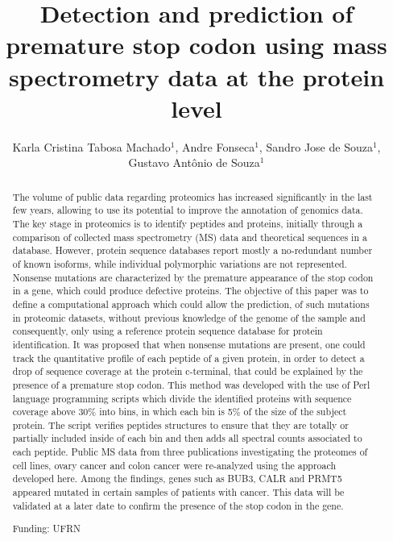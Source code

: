\documentclass[twoside]{article}
\title{\vspace{-15mm}\fontsize{24pt}{10pt}\selectfont\textbf{Detection and prediction of premature stop codon using mass spectrometry data at the protein level}} %
\author{Karla Cristina Tabosa Machado$^1$, Andre Fonseca$^1$, Sandro Jose de Souza$^1$, Gustavo Ant\^onio de Souza$^1$}
\affil{1 UFRN\\ }
\date{}
\begin{document}
\maketitle %

\thispagestyle{fancy} %


\begin{abstract}
The volume of public data regarding proteomics has increased significantly in the last few years, allowing to use its potential to improve the annotation of genomics data. The key stage in proteomics is to identify peptides and proteins, initially through a  comparison of collected mass spectrometry (MS) data and theoretical sequences in a database. However, protein sequence databases report mostly a no-redundant number of known isoforms, while individual polymorphic variations are not represented. Nonsense mutations are characterized by the premature appearance of the stop codon in a gene, which could produce defective proteins. The objective of this paper was to define a computational approach which could allow the prediction, of such mutations in proteomic datasets, without previous knowledge of the genome of the sample and consequently, only using a reference protein sequence database for protein identification. It was proposed that when nonsense mutations are present, one could track the quantitative profile of each peptide of a given protein,  in order to detect a drop of sequence coverage at the protein c-terminal, that could be explained by the presence of a premature stop codon. This method was developed with the use of Perl language programming scripts which divide the identified proteins with sequence coverage above 30\% into bins, in which each bin is 5\% of the size of the subject protein. The script verifies peptides structures to ensure that they are totally or partially included inside of each bin and then adds all spectral counts associated to each peptide. Public MS data from three publications investigating the proteomes of cell lines, ovary cancer and colon cancer were re-analyzed using the approach developed here. Among the findings, genes such as BUB3, CALR and PRMT5 appeared mutated in certain samples of patients with cancer. This data will be validated at a later date to confirm the presence of the stop codon in the gene.

Funding: UFRN
\end{abstract}
\end{document}
